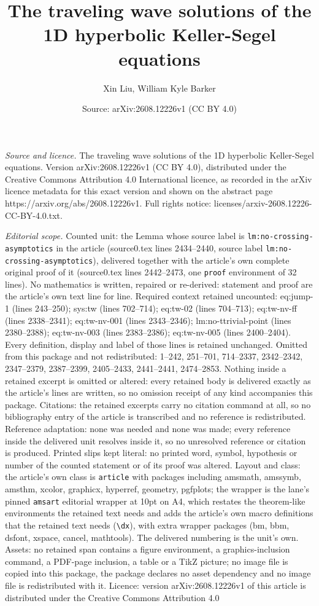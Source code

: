 \documentclass[10pt,a4paper]{amsart}
\title[The traveling wave solutions of the 1D hyperbolic Keller-Seg]{The traveling wave solutions of the 1D hyperbolic Keller-Segel equations}
\author{Xin Liu, William Kyle Barker}
\date{Source: arXiv:2608.12226v1 (CC BY 4.0)}
\begin{document}
\maketitle

\noindent\emph{Source and licence.} The traveling wave solutions of the 1D hyperbolic Keller-Segel equations. Version arXiv:2608.12226v1 (CC BY 4.0), distributed under the Creative Commons Attribution 4.0 International licence, as recorded in the arXiv licence metadata for this exact version and shown on the abstract page https://arxiv.org/abs/2608.12226v1. Full rights notice: licenses/arxiv-2608.12226-CC-BY-4.0.txt.\par\smallskip

\noindent\textit{Editorial scope.} Counted unit: the Lemma whose source label is \texttt{lm:no-crossing-asymptotics} in the article (source0.tex lines 2434--2440, source label \texttt{lm:no-crossing-asymptotics}), delivered together with the article's own complete original proof of it (source0.tex lines 2442--2473, one \texttt{proof} environment of 32 lines). No mathematics is written, repaired or re-derived: statement and proof are the article's own text line for line. Required context retained uncounted: eq:jump-1 (lines 243--250); sys:tw (lines 702--714); eq:tw-02 (lines 704--713); eq:tw-nv-ff (lines 2338--2341); eq:tw-nv-001 (lines 2343--2346); lm:no-ttrivial-point (lines 2380--2388); eq:tw-nv-003 (lines 2383--2386); eq:tw-nv-005 (lines 2400--2404). Every definition, display and label of those lines is retained unchanged. Omitted from this package and not redistributed: 1--242, 251--701, 714--2337, 2342--2342, 2347--2379, 2387--2399, 2405--2433, 2441--2441, 2474--2853. Nothing inside a retained excerpt is omitted or altered: every retained body is delivered exactly as the article's lines are written, so no omission receipt of any kind accompanies this package. Citations: the retained excerpts carry no citation command at all, so no bibliography entry of the article is transcribed and no reference is redistributed. Reference adaptation: none was needed and none was made; every reference inside the delivered unit resolves inside it, so no unresolved reference or citation is produced. Printed slips kept literal: no printed word, symbol, hypothesis or number of the counted statement or of its proof was altered. Layout and class: the article's own class is \texttt{article} with packages including amsmath, amssymb, amsthm, xcolor, graphicx, hyperref, geometry, pgfplots; the wrapper is the lane's pinned \texttt{amsart} editorial wrapper at 10pt on A4, which restates the theorem-like environments the retained text needs and adds the article's own macro definitions that the retained text needs (\texttt{\textbackslash dx}), with extra wrapper packages (bm, bbm, dsfont, xspace, cancel, mathtools). The delivered numbering is the unit's own. Assets: no retained span contains a figure environment, a graphics-inclusion command, a PDF-page inclusion, a table or a TikZ picture; no image file is copied into this package, the package declares no asset dependency and no image file is redistributed with it. Licence: version arXiv:2608.12226v1 of this article is distributed under the Creative Commons Attribution 4.0 
\end{document}
